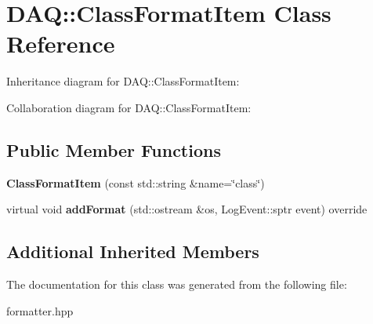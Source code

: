 \hypertarget{classDAQ_1_1ClassFormatItem}{}\section{D\+AQ\+:\+:Class\+Format\+Item Class Reference}
\label{classDAQ_1_1ClassFormatItem}


Inheritance diagram for D\+AQ\+:\+:Class\+Format\+Item\+:


Collaboration diagram for D\+AQ\+:\+:Class\+Format\+Item\+:
\subsection*{Public Member Functions}
\begin{DoxyCompactItemize}
\item 
\mbox{\label{classDAQ_1_1ClassFormatItem_a3154fe9ef4c19f39cb95278f69340b08}} 
{\bfseries Class\+Format\+Item} (const std\+::string \&name=\char`\"{}class\char`\"{})
\item 
\mbox{\label{classDAQ_1_1ClassFormatItem_a37747dcb2384b7ebb269b1eb94934bf4}} 
virtual void {\bfseries add\+Format} (std\+::ostream \&os, Log\+Event\+::sptr event) override
\end{DoxyCompactItemize}
\subsection*{Additional Inherited Members}


The documentation for this class was generated from the following file\+:\begin{DoxyCompactItemize}
\item 
formatter.\+hpp\end{DoxyCompactItemize}
